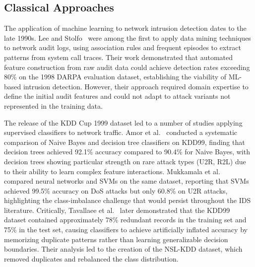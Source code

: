 \documentclass[12pt, letterpaper, oneside]{report}
\begin{document}
\subsection{Classical Approaches}

The application of machine learning to network intrusion detection dates to the late 1990s. Lee and Stolfo~\citep{lee1998} were among the first to apply data mining techniques to network audit logs, using association rules and frequent episodes to extract patterns from system call traces. Their work demonstrated that automated feature construction from raw audit data could achieve detection rates exceeding 80\% on the 1998 DARPA evaluation dataset, establishing the viability of ML-based intrusion detection. However, their approach required domain expertise to define the initial audit features and could not adapt to attack variants not represented in the training data.

The release of the KDD Cup 1999 dataset led to a number of studies applying supervised classifiers to network traffic. Amor et al.~\citep{amor2004naive} conducted a systematic comparison of Naive Bayes and decision tree classifiers on KDD99, finding that decision trees achieved 92.1\% accuracy compared to 90.4\% for Naive Bayes, with decision trees showing particular strength on rare attack types (U2R, R2L) due to their ability to learn complex feature interactions. Mukkamala et al.~\citep{mukkamala2002intrusion} compared neural networks and SVMs on the same dataset, reporting that SVMs achieved 99.5\% accuracy on DoS attacks but only 60.8\% on U2R attacks, highlighting the class-imbalance challenge that would persist throughout the IDS literature. Critically, Tavallaee et al.~\citep{tavallaee2009} later demonstrated that the KDD99 dataset contained approximately 78\% redundant records in the training set and 75\% in the test set, causing classifiers to achieve artificially inflated accuracy by memorizing duplicate patterns rather than learning generalizable decision boundaries. Their analysis led to the creation of the NSL-KDD dataset, which removed duplicates and rebalanced the class distribution.
\end{document}
